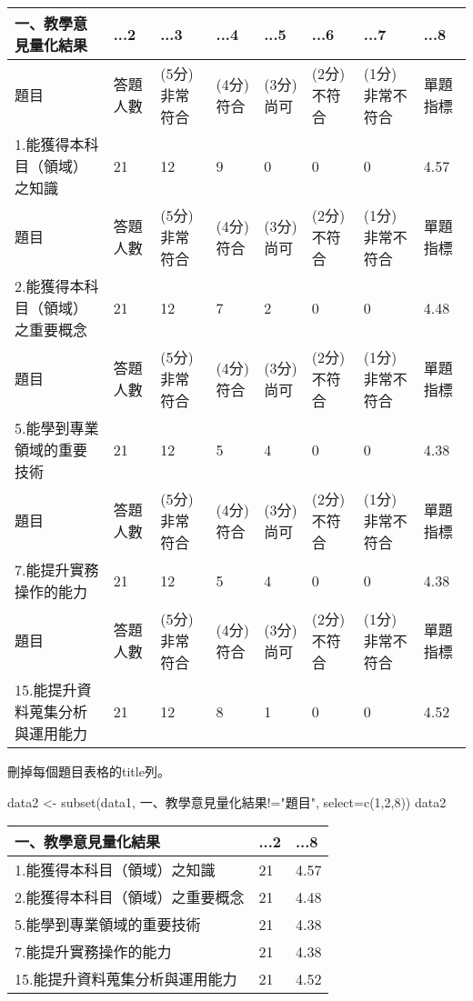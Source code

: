 \documentclass[
]{book}
\newenvironment{Shaded}{\begin{snugshade}}{\end{snugshade}}
\newcommand{\AttributeTok}[1]{\textcolor[rgb]{0.77,0.63,0.00}{#1}}
\newcommand{\DecValTok}[1]{\textcolor[rgb]{0.00,0.00,0.81}{#1}}
\newcommand{\FunctionTok}[1]{\textcolor[rgb]{0.00,0.00,0.00}{#1}}
\newcommand{\NormalTok}[1]{#1}
\newcommand{\OtherTok}[1]{\textcolor[rgb]{0.56,0.35,0.01}{#1}}
\newcommand{\SpecialCharTok}[1]{\textcolor[rgb]{0.00,0.00,0.00}{#1}}
\newcommand{\StringTok}[1]{\textcolor[rgb]{0.31,0.60,0.02}{#1}}
\begin{document}
\begin{tabular}{l|l|l|l|l|l|l|l}
\hline
一、教學意見量化結果 & ...2 & ...3 & ...4 & ...5 & ...6 & ...7 & ...8\\
\hline
題目 & 答題人數 & (5分)非常符合 & (4分)符合 & (3分)尚可 & (2分)不符合 & (1分)非常不符合 & 單題指標\\
\hline
1.能獲得本科目（領域）之知識 & 21 & 12 & 9 & 0 & 0 & 0 & 4.57\\
\hline
題目 & 答題人數 & (5分)非常符合 & (4分)符合 & (3分)尚可 & (2分)不符合 & (1分)非常不符合 & 單題指標\\
\hline
2.能獲得本科目（領域）之重要概念 & 21 & 12 & 7 & 2 & 0 & 0 & 4.48\\
\hline
題目 & 答題人數 & (5分)非常符合 & (4分)符合 & (3分)尚可 & (2分)不符合 & (1分)非常不符合 & 單題指標\\
\hline
5.能學到專業領域的重要技術 & 21 & 12 & 5 & 4 & 0 & 0 & 4.38\\
\hline
題目 & 答題人數 & (5分)非常符合 & (4分)符合 & (3分)尚可 & (2分)不符合 & (1分)非常不符合 & 單題指標\\
\hline
7.能提升實務操作的能力 & 21 & 12 & 5 & 4 & 0 & 0 & 4.38\\
\hline
題目 & 答題人數 & (5分)非常符合 & (4分)符合 & (3分)尚可 & (2分)不符合 & (1分)非常不符合 & 單題指標\\
\hline
15.能提升資料蒐集分析與運用能力 & 21 & 12 & 8 & 1 & 0 & 0 & 4.52\\
\hline
\end{tabular}

刪掉每個題目表格的title列。

\begin{Shaded}
\begin{Highlighting}[]
\NormalTok{data2 }\OtherTok{\textless{}{-}} \FunctionTok{subset}\NormalTok{(data1, }\StringTok{\textasciigrave{}}\AttributeTok{一、教學意見量化結果}\StringTok{\textasciigrave{}}\SpecialCharTok{!=}\StringTok{"題目"}\NormalTok{, }\AttributeTok{select=}\FunctionTok{c}\NormalTok{(}\DecValTok{1}\NormalTok{,}\DecValTok{2}\NormalTok{,}\DecValTok{8}\NormalTok{))}
\NormalTok{data2}
\end{Highlighting}
\end{Shaded}

\begin{tabular}{l|l|l}
\hline
一、教學意見量化結果 & ...2 & ...8\\
\hline
1.能獲得本科目（領域）之知識 & 21 & 4.57\\
\hline
2.能獲得本科目（領域）之重要概念 & 21 & 4.48\\
\hline
5.能學到專業領域的重要技術 & 21 & 4.38\\
\hline
7.能提升實務操作的能力 & 21 & 4.38\\
\hline
15.能提升資料蒐集分析與運用能力 & 21 & 4.52\\
\hline
\end{tabular}
\end{document}
